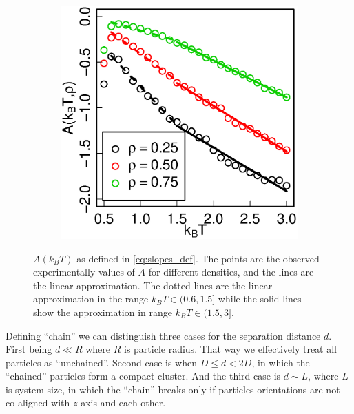 \begin{figure}[h]
\centering
\begin{subfigure}[t]{0.40\textwidth}
	\centering
	\includegraphics[width=\textwidth]{Images/distCorSlopes}
\end{subfigure}
	\captionsetup{justification=centering, width=0.9\columnwidth}
	\caption{$A(k_BT)$ as defined in \eqref{eq:slopes_def}. The points are the observed experimentally values of $A$ for different densities, and the lines are the linear approximation. The dotted lines are the linear approximation in the range $k_BT \in (0.6, 1.5]$ while the solid lines show the approximation in range $k_BT \in (1.5, 3]$.}
	\label{fig:dist_corr_eq_slopes}
\end{figure}

Defining ``chain'' we can distinguish three cases for the separation distance $d$. First being $d \ll R$ where $R$ is particle radius. That way we effectively treat all particles as ``unchained''. Second case is when $D \leq d < 2 D$, in which the ``chained'' particles form a compact cluster. And the third case is $d \sim L$, where $L$ is system size, in which the ``chain'' breaks only if particles orientations are not co-aligned with $z$ axis and each other.